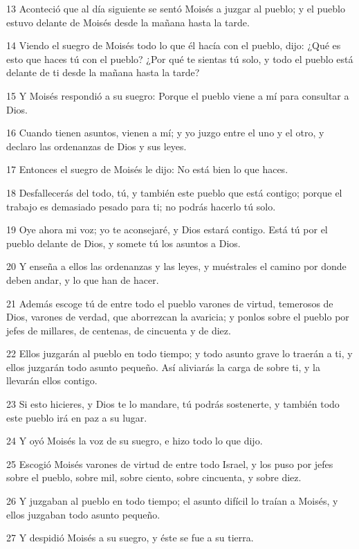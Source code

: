 \par 13 Aconteció que al día siguiente se sentó Moisés a juzgar al pueblo; y el pueblo estuvo delante de Moisés desde la mañana hasta la tarde.
\par 14 Viendo el suegro de Moisés todo lo que él hacía con el pueblo, dijo: ¿Qué es esto que haces tú con el pueblo? ¿Por qué te sientas tú solo, y todo el pueblo está delante de ti desde la mañana hasta la tarde?
\par 15 Y Moisés respondió a su suegro: Porque el pueblo viene a mí para consultar a Dios.
\par 16 Cuando tienen asuntos, vienen a mí; y yo juzgo entre el uno y el otro, y declaro las ordenanzas de Dios y sus leyes.
\par 17 Entonces el suegro de Moisés le dijo: No está bien lo que haces.
\par 18 Desfallecerás del todo, tú, y también este pueblo que está contigo; porque el trabajo es demasiado pesado para ti; no podrás hacerlo tú solo.
\par 19 Oye ahora mi voz; yo te aconsejaré, y Dios estará contigo. Está tú por el pueblo delante de Dios, y somete tú los asuntos a Dios.
\par 20 Y enseña a ellos las ordenanzas y las leyes, y muéstrales el camino por donde deben andar, y lo que han de hacer.
\par 21 Además escoge tú de entre todo el pueblo varones de virtud, temerosos de Dios, varones de verdad, que aborrezcan la avaricia; y ponlos sobre el pueblo por jefes de millares, de centenas, de cincuenta y de diez.
\par 22 Ellos juzgarán al pueblo en todo tiempo; y todo asunto grave lo traerán a ti, y ellos juzgarán todo asunto pequeño. Así aliviarás la carga de sobre ti, y la llevarán ellos contigo.
\par 23 Si esto hicieres, y Dios te lo mandare, tú podrás sostenerte, y también todo este pueblo irá en paz a su lugar.
\par 24 Y oyó Moisés la voz de su suegro, e hizo todo lo que dijo.
\par 25 Escogió Moisés varones de virtud de entre todo Israel, y los puso por jefes sobre el pueblo, sobre mil, sobre ciento, sobre cincuenta, y sobre diez.
\par 26 Y juzgaban al pueblo en todo tiempo; el asunto difícil lo traían a Moisés, y ellos juzgaban todo asunto pequeño.
\par 27 Y despidió Moisés a su suegro, y éste se fue a su tierra.

